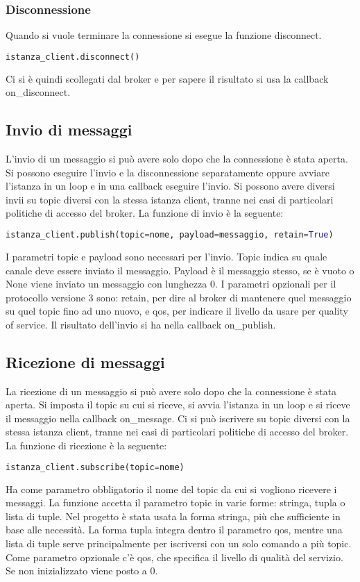 \subsubsection{Disconnessione}
\label{subsubsec:client-creazione-connesione-disconnessione}
Quando si vuole terminare la connessione si esegue la funzione disconnect.
\begin{lstlisting}[language=python]
	istanza_client.disconnect()
\end{lstlisting}
Ci si è quindi scollegati dal broker e per sapere il risultato si usa la callback on\_disconnect.

\subsection{Invio di messaggi}
\label{subsec:client-creazione-invio}
L'invio di un messaggio si può avere solo dopo che la connessione è stata aperta.
Si possono eseguire l'invio e la disconnessione separatamente oppure avviare l'istanza in un loop e in una callback eseguire l'invio.
Si possono avere diversi invii su topic diversi con la stessa istanza client, tranne nei casi di particolari politiche di accesso del broker.
La funzione di invio è la seguente:
\begin{lstlisting}[language=python]
	istanza_client.publish(topic=nome, payload=messaggio, retain=True)
\end{lstlisting}
I parametri topic e payload sono necessari per l'invio.
Topic indica su quale canale deve essere inviato il messaggio.
Payload è il messaggio stesso, se è vuoto o None viene inviato un messaggio con lunghezza 0.
I parametri opzionali per il protocollo versione 3 sono:
retain, per dire al broker di mantenere quel messaggio su quel topic fino ad uno nuovo,
e qos, per indicare il livello da usare per quality of service.\newline
Il risultato dell'invio si ha nella callback on\_publish.

\subsection{Ricezione di messaggi}
\label{subsec:client-creazione-ricezione}
La ricezione di un messaggio si può avere solo dopo che la connessione è stata aperta.
Si imposta il topic su cui si riceve, si avvia l'istanza in un loop e si riceve il messaggio nella callback on\_message.
Ci si può iscrivere su topic diversi con la stessa istanza client, tranne nei casi di particolari politiche di accesso del broker.
La funzione di ricezione è la seguente:
\begin{lstlisting}[language=python]
	istanza_client.subscribe(topic=nome)
\end{lstlisting}
Ha come parametro obbligatorio il nome del topic da cui si vogliono ricevere i messaggi.
La funzione accetta il parametro topic in varie forme: stringa, tupla o lista di tuple. 
Nel progetto è stata usata la forma stringa, più che sufficiente in base alle necessità.
La forma tupla integra dentro il parametro qos, 
mentre una lista di tuple serve principalmente per iscriversi con un solo comando a più topic.
Come parametro opzionale c'è qos, che specifica il livello di qualità del servizio. Se non inizializzato viene posto a 0.


